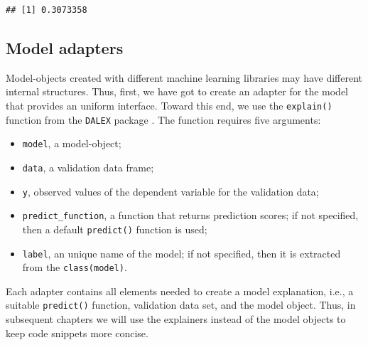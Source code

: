 \documentclass[]{krantz}
\providecommand{\tightlist}{%
  \setlength{\itemsep}{0pt}\setlength{\parskip}{0pt}}
\begin{document}
\begin{verbatim}
## [1] 0.3073358
\end{verbatim}

\hypertarget{ExplainersTitanicRCode}{%
\subsection{Model adapters}\label{ExplainersTitanicRCode}}

Model-objects created with different machine learning libraries may have different internal structures. Thus, first, we have got to create an adapter for the model that provides an uniform interface. Toward this end, we use the \texttt{explain()} function from the \texttt{DALEX} package \citep{DALEX}. The function requires five arguments:

\begin{itemize}
\tightlist
\item
  \texttt{model}, a model-object;
\item
  \texttt{data}, a validation data frame;
\item
  \texttt{y}, observed values of the dependent variable for the validation data;
\item
  \texttt{predict\_function}, a function that returns prediction scores; if not specified, then a default \texttt{predict()} function is used;
\item
  \texttt{label}, an unique name of the model; if not specified, then it is extracted from the \texttt{class(model)}.
\end{itemize}

Each adapter contains all elements needed to create a model explanation, i.e., a suitable \texttt{predict()} function, validation data set, and the model object. Thus, in subsequent chapters we will use the explainers instead of the model objects to keep code snippets more concise.
\end{document}
